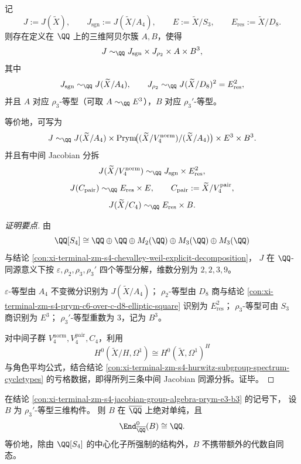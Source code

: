 \begin{conclusion}\label{con:xi-terminal-zm-s4-jacobian-group-algebra-prym-e3-b3}
记
\[
J:=J(\widetilde{X}),\qquad
J_{\mathrm{sgn}}:=J(\widetilde{X}/A_4),\qquad
E:=\widetilde{X}/S_3,\qquad
E_{\mathrm{res}}:=\widetilde{X}/D_8.
\]
则存在定义在 \(\QQ\) 上的三维阿贝尔簇 \(A,B\)，使得
\[
J\sim_{\QQ}J_{\mathrm{sgn}}\times J_{\rho_2}\times A\times B^3,
\]
其中
\[
J_{\mathrm{sgn}}\sim_{\QQ}J(\widetilde{X}/A_4),\qquad
J_{\rho_2}\sim_{\QQ}J(\widetilde{X}/D_8)^2=E_{\mathrm{res}}^2,
\]
并且 \(A\) 对应 \(\rho_3\)-等型（可取 \(A\sim_{\QQ}E^3\)），\(B\) 对应 \(\rho_3'\)-等型。

等价地，可写为
\[
J\sim_{\QQ}J(\widetilde{X}/A_4)\times \operatorname{Prym}\!\bigl((\widetilde{X}/V_4^{\mathrm{norm}})/(\widetilde{X}/A_4)\bigr)\times E^{3}\times B^{3}.
\]
并且有中间 Jacobian 分拆
\[
J(\widetilde{X}/V_4^{\mathrm{norm}})\sim_{\QQ}J_{\mathrm{sgn}}\times E_{\mathrm{res}}^{2},
\]
\[
J(C_{\mathrm{pair}})\sim_{\QQ}E_{\mathrm{res}}\times E,\qquad
C_{\mathrm{pair}}:=\widetilde{X}/V_4^{\mathrm{pair}},
\]
\[
J(\widetilde{X}/C_4)\sim_{\QQ}E_{\mathrm{res}}\times B.
\]
\end{conclusion}
\begin{proof}[证明要点]
由
\[
\QQ[S_4]\cong \QQ\oplus \QQ\oplus M_2(\QQ)\oplus M_3(\QQ)\oplus M_3(\QQ)
\]
与结论 \ref{con:xi-terminal-zm-s4-chevalley-weil-explicit-decomposition}，
\(J\) 在 \(\QQ\)-同源意义下按 \(\varepsilon,\rho_2,\rho_3,\rho_3'\) 四个等型分解，维数分别为 \(2,2,3,9\)。

\(\varepsilon\)-等型由 \(A_4\) 不变微分识别为 \(J(\widetilde{X}/A_4)\)；
\(\rho_2\)-等型由 \(D_8\) 商与结论 \ref{con:xi-terminal-zm-s4-prym-c6-over-c-d8-elliptic-square} 识别为 \(E_{\mathrm{res}}^2\)；
\(\rho_3\)-等型可由 \(S_3\) 商识别为 \(E^3\)；
\(\rho_3'\)-等型重数为 \(3\)，记为 \(B^3\)。

对中间子群 \(V_4^{\mathrm{norm}},V_4^{\mathrm{pair}},C_4\)，利用
\[
H^0(\widetilde{X}/H,\Omega^1)\cong H^0(\widetilde{X},\Omega^1)^H
\]
与角色平均公式，结合结论 \ref{con:xi-terminal-zm-s4-hurwitz-subgroup-spectrum-cycletypes} 的亏格数据，即得所列三条中间 Jacobian 同源分拆。证毕。
\end{proof}

\begin{conjecture}\label{conj:xi-terminal-zm-s4-b-absolute-simplicity-endomorphism}
在结论 \ref{con:xi-terminal-zm-s4-jacobian-group-algebra-prym-e3-b3} 的记号下，
设 \(B\) 为 \(\rho_3'\)-等型三维构件。
则 \(B\) 在 \(\overline{\QQ}\) 上绝对单纯，且
\[
\End^0_{\overline{\QQ}}(B)\cong \QQ.
\]
等价地，除由 \(\QQ[S_4]\) 的中心化子所强制的结构外，\(B\) 不携带额外的代数自同态。
\end{conjecture}


